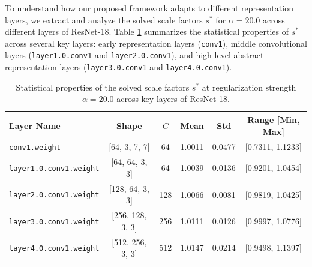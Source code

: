 \documentclass{article}
\theoremstyle{plain}
\theoremstyle{definition}
\theoremstyle{remark}
\begin{document}
To understand how our proposed framework adapts to different representation layers, we extract and analyze the solved scale factors $s^*$ for $\alpha=20.0$ across different layers of ResNet-18. 
Table \ref{tab:layer_scales} summarizes the statistical properties of $s^*$ across several key layers: early representation layers (\texttt{conv1}), middle convolutional layers (\texttt{layer1.0.conv1} and \texttt{layer2.0.conv1}), and high-level abstract representation layers (\texttt{layer3.0.conv1} and \texttt{layer4.0.conv1}).

\begin{table}[t]
\caption{Statistical properties of the solved scale factors $s^*$ at regularization strength $\alpha=20.0$ across key layers of ResNet-18.}
\label{tab:layer_scales}
\vskip 0.15in
\begin{center}
\begin{small}
\begin{sc}
\begin{tabular}{lccccc}
\toprule
Layer Name & Shape & $C$ & Mean & Std & Range [Min, Max] \\
\midrule
\texttt{conv1.weight} & [64, 3, 7, 7] & 64 & 1.0011 & 0.0477 & [0.7311, 1.1233] \\
\texttt{layer1.0.conv1.weight} & [64, 64, 3, 3] & 64 & 1.0039 & 0.0136 & [0.9201, 1.0454] \\
\texttt{layer2.0.conv1.weight} & [128, 64, 3, 3] & 128 & 1.0066 & 0.0081 & [0.9819, 1.0425] \\
\texttt{layer3.0.conv1.weight} & [256, 128, 3, 3] & 256 & 1.0111 & 0.0126 & [0.9997, 1.0776] \\
\texttt{layer4.0.conv1.weight} & [512, 256, 3, 3] & 512 & 1.0147 & 0.0214 & [0.9498, 1.1397] \\
\bottomrule
\end{tabular}
\end{sc}
\end{small}
\end{center}
\vskip -0.1in
\end{table}
\end{document}
